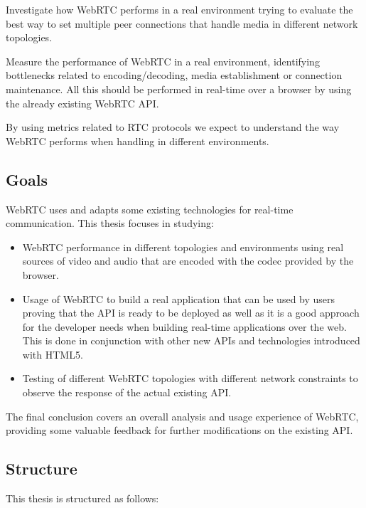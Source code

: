 Investigate how WebRTC performs in a real environment trying to evaluate the best way to set multiple peer connections that handle media in different network topologies. 

Measure the performance of WebRTC in a real environment, identifying bottlenecks related to encoding/decoding, media establishment or connection maintenance. All this should be performed in real-time over a browser by using the already existing WebRTC API.

By using metrics related to RTC protocols we expect to understand the way WebRTC performs when handling in different environments.

\subsection{Goals}

WebRTC uses and adapts some existing technologies for real-time communication. This thesis focuses in studying:

\begin{itemize}
	\item WebRTC performance in different topologies and environments using real sources of video and audio that are encoded with the codec provided by the browser.
	
	\item Usage of WebRTC to build a real application that can be used by users proving that the API is ready to be deployed as well as it is a good approach for the developer needs when building real-time applications over the web. This is done in conjunction with other new APIs and technologies introduced with HTML5.
	
	\item Testing of different WebRTC topologies with different network constraints to observe the response of the actual existing API.
\end{itemize}

The final conclusion covers an overall analysis and usage experience of WebRTC, providing some valuable feedback for further modifications on the existing API.

\subsection{Structure}

This thesis is structured as follows: 


